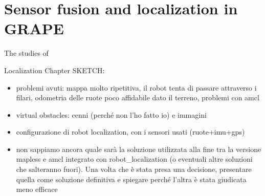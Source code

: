 
\chapter{Sensor fusion and localization in GRAPE} \label{chap:localization}

The studies of \cite{outdoorNavigation}

Localization Chapter SKETCH:
\begin{itemize}
	\item problemi avuti: mappa molto ripetitiva, il robot tenta di passare attraverso i filari, odometria delle ruote poco affidabile dato il terreno, problemi con amcl
	\item virtual obstacles: cenni (perché non l'ho fatto io) e immagini
	\item configurazione di robot localization, con i sensori usati (ruote+imu+gps)
	\item non sappiamo ancora quale sarà la soluzione utilizzata alla fine tra la versione mapless e amcl integrato con robot\_localization (o eventuali altre soluzioni che salteranno fuori). Una volta che è stata presa una decisione, presentare quella come soluzione definitiva e spiegare perché l'altra è stata giudicata meno efficace
\end{itemize}

